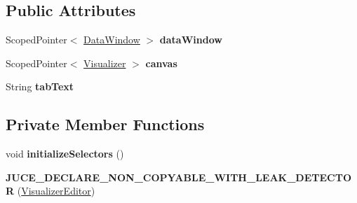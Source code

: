 \subsection*{Public Attributes}
\begin{DoxyCompactItemize}
\item 
\hypertarget{classVisualizerEditor_ab8caef8de0f8eeedb81a936d81b354bc}{Scoped\-Pointer$<$ \hyperlink{classDataWindow}{Data\-Window} $>$ {\bfseries data\-Window}}\label{classVisualizerEditor_ab8caef8de0f8eeedb81a936d81b354bc}

\item 
\hypertarget{classVisualizerEditor_a31c5fc40fd3bb3f3777a600c75c57171}{Scoped\-Pointer$<$ \hyperlink{classVisualizer}{Visualizer} $>$ {\bfseries canvas}}\label{classVisualizerEditor_a31c5fc40fd3bb3f3777a600c75c57171}

\item 
\hypertarget{classVisualizerEditor_a3a412027e66432c1d399e00a089f414e}{String {\bfseries tab\-Text}}\label{classVisualizerEditor_a3a412027e66432c1d399e00a089f414e}

\end{DoxyCompactItemize}
\subsection*{Private Member Functions}
\begin{DoxyCompactItemize}
\item 
\hypertarget{classVisualizerEditor_a4bd8aa75dfee06f821fbea618ea6fced}{void {\bfseries initialize\-Selectors} ()}\label{classVisualizerEditor_a4bd8aa75dfee06f821fbea618ea6fced}

\item 
\hypertarget{classVisualizerEditor_a1b471d9680da48e36672ba9865f2f873}{{\bfseries J\-U\-C\-E\-\_\-\-D\-E\-C\-L\-A\-R\-E\-\_\-\-N\-O\-N\-\_\-\-C\-O\-P\-Y\-A\-B\-L\-E\-\_\-\-W\-I\-T\-H\-\_\-\-L\-E\-A\-K\-\_\-\-D\-E\-T\-E\-C\-T\-O\-R} (\hyperlink{classVisualizerEditor}{Visualizer\-Editor})}\label{classVisualizerEditor_a1b471d9680da48e36672ba9865f2f873}

\end{DoxyCompactItemize}
